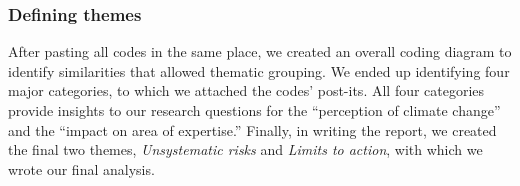 
\subsubsection{Defining themes}

After pasting all codes in the same place, we created an overall coding diagram to identify similarities that allowed thematic grouping. We ended up identifying four major categories, to which we attached the codes' post-its. %
All four categories provide insights to our research questions for the ``perception of climate change'' and the ``impact on area of expertise.'' Finally, in writing the report, we created the final two themes, \emph{Unsystematic risks} and \emph{Limits to action}, with which we wrote our final analysis.



